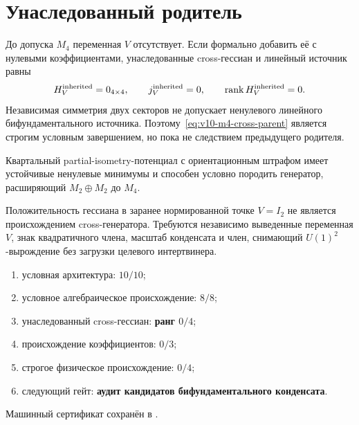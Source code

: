 \section{Унаследованный родитель}

До допуска $M_4$ переменная $V$ отсутствует. Если формально добавить её с
нулевыми коэффициентами, унаследованные cross-гессиан и линейный источник
равны
\begin{equation}
 H_V^{\rm inherited}=0_{4\times4},\qquad j_V^{\rm inherited}=0,
 \qquad \operatorname{rank} H_V^{\rm inherited}=0.
\end{equation}
Независимая симметрия двух секторов не допускает ненулевого линейного
бифундаментального источника. Поэтому~\eqref{eq:v10-m4-cross-parent}
является строгим условным завершением, но пока не следствием предыдущего
родителя.

\begin{theorem}
Квартальный partial-isometry-потенциал с ориентационным штрафом имеет
устойчивые ненулевые минимумы и способен условно породить генератор,
расширяющий $M_2\oplus M_2$ до $M_4$.
\end{theorem}

\begin{nogocriterion}
Положительность гессиана в заранее нормированной точке $V=I_2$ не является
происхождением cross-генератора. Требуются независимо выведенные переменная
$V$, знак квадратичного члена, масштаб конденсата и член, снимающий
$U(1)^2$-вырождение без загрузки целевого интертвинера.
\end{nogocriterion}

\begin{protocol}\begin{enumerate}
\item условная архитектура: \textbf{$10/10$};
\item условное алгебраическое происхождение: \textbf{$8/8$};
\item унаследованный cross-гессиан: \textbf{ранг $0/4$};
\item происхождение коэффициентов: \textbf{$0/3$};
\item строгое физическое происхождение: \textbf{$0/4$};
\item следующий гейт: \textbf{аудит кандидатов бифундаментального конденсата}.
\end{enumerate}\end{protocol}

Машинный сертификат сохранён в
.
